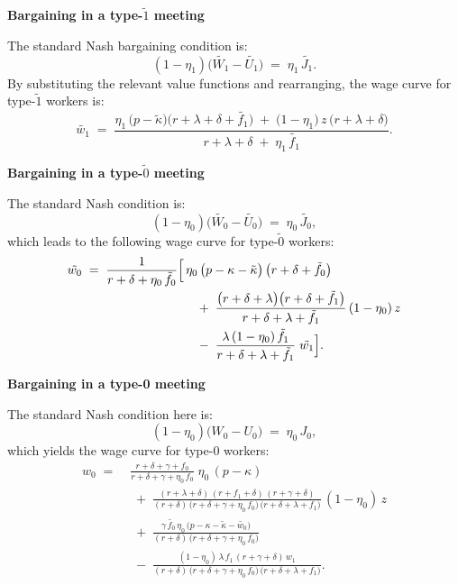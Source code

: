 \documentclass[12pt]{article} %
\theoremstyle{definition}
\begin{document}
\bigskip 
\noindent \textbf{Bargaining in a type-$\tilde{1}$ meeting}

\medskip

\noindent The standard Nash bargaining condition is:
\begin{equation}
(1-\eta_1)\bigl(\tilde{W_1} - \tilde{U_1}\bigr) \;=\; \eta_1 \,\tilde{J_1}.\nonumber 
\end{equation}
By substituting the relevant value functions and rearranging, the wage curve for type-$\tilde{1}$ workers is:
\begin{equation}
\tilde{w_1} 
\;=\; \frac{\eta_1 \,\bigl(p - \tilde{\kappa}\bigr)\bigl(r+\lambda+\delta+\tilde{f_1}\bigr)
\;+\;\bigl(1-\eta_1\bigr)\,z\,\bigl(r+\lambda+\delta\bigr)}
{r+\lambda+\delta\;+\;\eta_1\,\tilde{f_1}}.
\label{eq WC 1 tilde mod}
\end{equation}
\bigskip 

\noindent \textbf{Bargaining in a type-$\tilde{0}$ meeting}

\medskip

\noindent The standard Nash condition is:
\[
(1-\eta_0)\bigl(\tilde{W_0} - \tilde{U_0}\bigr) \;=\; \eta_0 \,\tilde{J_0},
\]
which leads to the following wage curve for type-$\tilde{0}$ workers:
\begin{equation} 
\label{eq WC0 tilde mod}
\begin{split}
\tilde{w_0} \;=\; \frac{1}{r+\delta+\eta_0 \,\tilde{f_0}}
\Bigl[
&\,\eta_0\,\bigl(p-\kappa-\tilde{\kappa}\bigr)\,\bigl(r+\delta+\tilde{f_0}\bigr) \\
&\quad+\;\frac{\bigl(r+\delta+\lambda\bigr)\bigl(r+\delta+\tilde{f_1}\bigr)}{r+\delta+\lambda+\tilde{f_1}}\,(1-\eta_0)\,z \\
&\quad-\;\frac{\lambda\,(1-\eta_0)\,\tilde{f_1}}{r+\delta+\lambda+\tilde{f_1}}\;\tilde{w_1}
\Bigr].
\end{split}
\end{equation}

\bigskip

\noindent \textbf{Bargaining in a type-0 meeting}

\medskip

\noindent The standard Nash condition here is:
\[
(1-\eta_0)\bigl(W_0 - U_0\bigr) \;=\; \eta_0\,J_0,
\]
which yields the wage curve for type-0 workers:
\begin{equation}\label{eq WC0 mod}
\begin{split}
w_0 \;=\;& \frac{r+\delta+\gamma+f_0}{r+\delta+\gamma+\eta_0\,f_0}\;\eta_0\,(p-\kappa) \\
&\;+\;\frac{(r+\lambda+\delta)\,(r+f_1+\delta)\,(r+\gamma+\delta)}{(r+\delta)\,\bigl(r+\delta+\gamma+\eta_0\,f_0\bigr)\,\bigl(r+\delta+\lambda+f_1\bigr)}\,(1-\eta_0)\,z \\  
&\;+\;\frac{\gamma\,\tilde{f_0}\,\eta_0\,\bigl(p-\kappa-\tilde{\kappa}-\tilde{w_0}\bigr)}{(r+\delta)\,\bigl(r+\delta+\gamma+\eta_0\,f_0\bigr)} \\
&\;-\;\frac{(1-\eta_0)\,\lambda\,f_1\,(r+\gamma+\delta)\,w_1}{(r+\delta)\,\bigl(r+\delta+\gamma+\eta_0\,f_0\bigr)\,\bigl(r+\delta+\lambda+f_1\bigr)}.
\end{split}
\end{equation}
\end{document}
